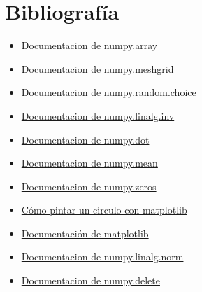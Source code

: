 \chapter{Bibliografía}
\begin{itemize}

   \item \href{https://docs.scipy.org/doc/numpy/reference/generated/numpy.array.html}{Documentacion de numpy.array}
   \item \href{https://docs.scipy.org/doc/numpy/reference/generated/numpy.meshgrid.html}{Documentacion de numpy.meshgrid}
   \item \href{https://docs.scipy.org/doc/numpy-1.13.0/reference/generated/numpy.random.choice.html}{Documentacion de numpy.random.choice}
   \item \href{https://docs.scipy.org/doc/numpy/reference/generated/numpy.linalg.inv.html}{Documentacion de numpy.linalg.inv}
   \item \href{https://docs.scipy.org/doc/numpy/reference/generated/numpy.dot.html}{Documentacion de numpy.dot}
   \item \href{https://het.as.utexas.edu/HET/Software/Numpy/reference/generated/numpy.mean.html#numpy.mean}{Documentacion de numpy.mean}
   \item \href{https://docs.scipy.org/doc/numpy/reference/generated/numpy.zeros.html#numpy.zeros}{Documentacion de numpy.zeros}
   \item \href{https://stackoverflow.com/questions/32092899/plot-equation-showing-a-circle}{Cómo pintar un circulo con matplotlib}
   \item \href{https://matplotlib.org/}{Documentación de matplotlib}
   \item \href{https://docs.scipy.org/doc/numpy/reference/generated/numpy.linalg.norm.html}{Documentacion de numpy.linalg.norm}
   \item \href{https://docs.scipy.org/doc/numpy/reference/generated/numpy.delete.html}{Documentacion de numpy.delete}

\end{itemize}
